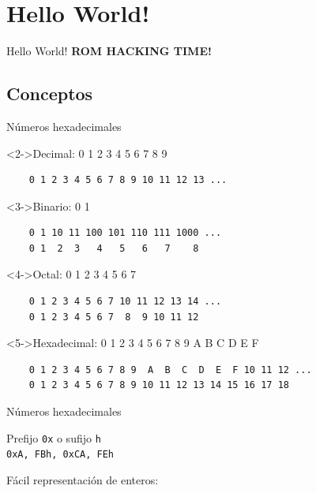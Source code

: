 \section{Hello World!}
\begin{frame}{Hello World!}
    \Huge\centering\textbf{ROM HACKING TIME!}
\end{frame}

\subsection{Conceptos}
\begin{frame}[fragile]{Números hexadecimales}
    \begin{uncoverenv}<2->Decimal: 0 1 2 3 4 5 6 7 8 9
    \begin{lstlisting}
    0 1 2 3 4 5 6 7 8 9 10 11 12 13 ...\end{lstlisting}\end{uncoverenv}

    \begin{uncoverenv}<3->Binario: 0 1
    \begin{lstlisting}
    0 1 10 11 100 101 110 111 1000 ...
    0 1  2  3   4   5   6   7    8\end{lstlisting}\end{uncoverenv}

    \begin{uncoverenv}<4->Octal: 0 1 2 3 4 5 6 7
    \begin{lstlisting}
    0 1 2 3 4 5 6 7 10 11 12 13 14 ...
    0 1 2 3 4 5 6 7  8  9 10 11 12\end{lstlisting}\end{uncoverenv}

    \begin{uncoverenv}<5->Hexadecimal: 0 1 2 3 4 5 6 7 8 9 A B C D E F
    \begin{lstlisting}
    0 1 2 3 4 5 6 7 8 9  A  B  C  D  E  F 10 11 12 ...
    0 1 2 3 4 5 6 7 8 9 10 11 12 13 14 15 16 17 18\end{lstlisting}\end{uncoverenv}
\end{frame}

\begin{frame}[fragile]{Números hexadecimales}
    \begin{wideitemize}
        \item<1-> Prefijo \texttt{0x} o sufijo \texttt{h} \\
        \texttt{0xA, FBh, 0xCA, FEh}

        \item<2-> Fácil representación de enteros:
    \end{wideitemize}
\end{frame}

